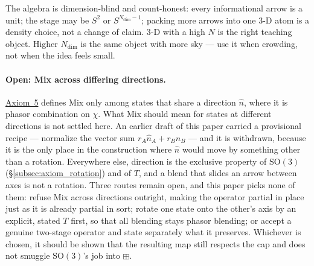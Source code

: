 \documentclass[12pt, a4paper]{article}
\begin{document}
The algebra is dimension-blind and count-honest: every informational
arrow is a unit; the stage may be $S^2$ or $S^{N_{\mathrm{dim}}-1}$;
packing more arrows into one 3-D atom is a density choice, not a
change of claim. 3-D with a high $N$ is the right teaching object.
Higher $N_{\mathrm{dim}}$ is the same object with more sky --- use it
when crowding, not when the idea feels small.

\paragraph{Open: Mix across differing directions.}
\label{subsec:mix_scattered_open}
\hyperref[subsec:axiom_interference]{Axiom~5} defines Mix only among states
that share a direction $\hat n$, where it is phasor combination on
$\chi$. What Mix should mean for states at different directions is not
settled here. An earlier draft of this paper carried a provisional
recipe --- normalize the vector sum $r_A\hat n_A+r_B\hat n_B$ --- and
it is withdrawn, because it is the only place in the construction
where $\hat n$ would move by something other than a rotation.
Everywhere else, direction is the exclusive property of
$\mathrm{SO}(3)$ (\S\ref{subsec:axiom_rotation}) and of $T$, and a
blend that slides an arrow between axes is not a rotation. Three
routes remain open, and this paper picks none of them: refuse Mix
across directions outright, making the operator partial in place just
as it is already partial in sort; rotate one state onto the other's
axis by an explicit, stated $T$ first, so that all blending stays
phasor blending; or accept a genuine two-stage operator and state
separately what it preserves. Whichever is chosen, it should be shown
that the resulting map still respects the cap and does not smuggle
$\mathrm{SO}(3)$'s job into $\boxplus$.
\end{document}
